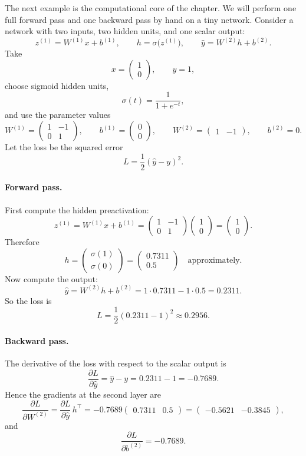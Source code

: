 The next example is the computational core of the chapter.
We will perform one full forward pass and one backward pass by hand on a tiny network.
Consider a network with two inputs, two hidden units, and one scalar output:
\[
 z^{(1)} = W^{(1)}x+b^{(1)},
 \qquad
 h=\sigma\bigl(z^{(1)}\bigr),
 \qquad
 \hat y = W^{(2)}h+b^{(2)}.
\]
Take
\[
 x=\begin{pmatrix}1\\0\end{pmatrix},
 \qquad
 y=1,
\]
choose sigmoid hidden units,
\[
 \sigma(t)=\frac{1}{1+e^{-t}},
\]
and use the parameter values
\[
 W^{(1)}=
 \begin{pmatrix}
 1 & -1\\
 0 & 1
 \end{pmatrix},
 \qquad
 b^{(1)}=
 \begin{pmatrix}
 0\\0
 \end{pmatrix},
 \qquad
 W^{(2)}=
 \begin{pmatrix}1 & -1\end{pmatrix},
 \qquad
 b^{(2)}=0.
\]
Let the loss be the squared error
\[
 L=\frac12(\hat y-y)^2.
\]

\paragraph{Forward pass.}
First compute the hidden preactivation:
\[
 z^{(1)}=W^{(1)}x+b^{(1)}
 =
 \begin{pmatrix}
 1 & -1\\
 0 & 1
 \end{pmatrix}
 \begin{pmatrix}1\\0\end{pmatrix}
 =
 \begin{pmatrix}1\\0\end{pmatrix}.
\]
Therefore
\[
 h=
 \begin{pmatrix}
 \sigma(1)\\
 \sigma(0)
 \end{pmatrix}
 =
 \begin{pmatrix}
 0.7311\\
 0.5
 \end{pmatrix}
 \quad\text{approximately.}
\]
Now compute the output:
\[
 \hat y = W^{(2)}h+b^{(2)} = 1\cdot 0.7311-1\cdot 0.5 = 0.2311.
\]
So the loss is
\[
 L=\frac12(0.2311-1)^2 \approx 0.2956.
\]

\paragraph{Backward pass.}
The derivative of the loss with respect to the scalar output is
\[
 \frac{\partial L}{\partial \hat y}=\hat y-y=0.2311-1=-0.7689.
\]
Hence the gradients at the second layer are
\[
 \frac{\partial L}{\partial W^{(2)}}
 =
 \frac{\partial L}{\partial \hat y}\, h^\top
 =
 -0.7689
 \begin{pmatrix}
 0.7311 & 0.5
 \end{pmatrix}
 =
 \begin{pmatrix}
 -0.5621 & -0.3845
 \end{pmatrix},
\]
and
\[
 \frac{\partial L}{\partial b^{(2)}}=-0.7689.
\]

